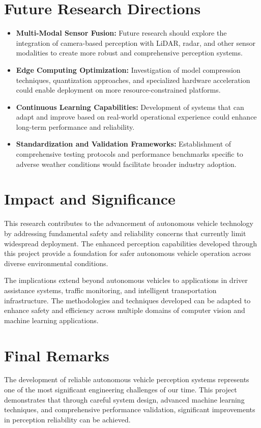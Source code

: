 \section{Future Research Directions}
\begin{itemize}
    \item \textbf{Multi-Modal Sensor Fusion:} Future research should explore the integration of camera-based perception with LiDAR, radar, and other sensor modalities to create more robust and comprehensive perception systems.

    \item \textbf{Edge Computing Optimization:} Investigation of model compression techniques, quantization approaches, and specialized hardware acceleration could enable deployment on more resource-constrained platforms.

    \item \textbf{Continuous Learning Capabilities:} Development of systems that can adapt and improve based on real-world operational experience could enhance long-term performance and reliability.

    \item \textbf{Standardization and Validation Frameworks:} Establishment of comprehensive testing protocols and performance benchmarks specific to adverse weather conditions would facilitate broader industry adoption.
\end{itemize}

\section{Impact and Significance}
This research contributes to the advancement of autonomous vehicle technology by addressing fundamental safety and reliability concerns that currently limit widespread deployment. The enhanced perception capabilities developed through this project provide a foundation for safer autonomous vehicle operation across diverse environmental conditions.

The implications extend beyond autonomous vehicles to applications in driver assistance systems, traffic monitoring, and intelligent transportation infrastructure. The methodologies and techniques developed can be adapted to enhance safety and efficiency across multiple domains of computer vision and machine learning applications.

\section{Final Remarks}
The development of reliable autonomous vehicle perception systems represents one of the most significant engineering challenges of our time. This project demonstrates that through careful system design, advanced machine learning techniques, and comprehensive performance validation, significant improvements in perception reliability can be achieved.

